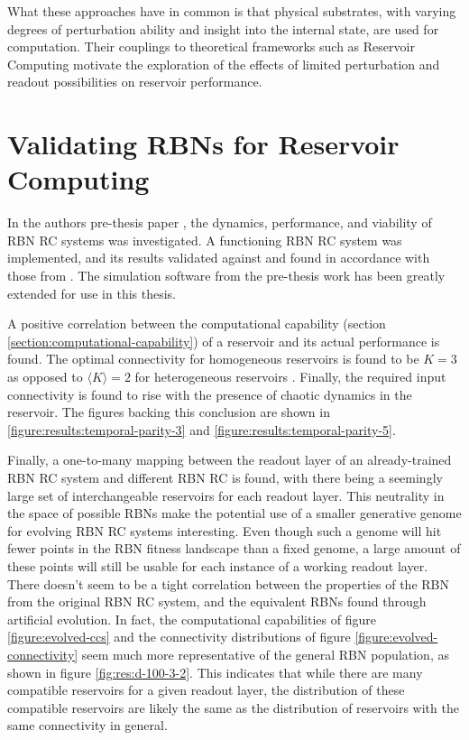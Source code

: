 What these approaches have in common is that physical substrates,
with varying degrees of perturbation ability and insight into the internal state,
are used for computation.
Their couplings to theoretical frameworks such as Reservoir Computing motivate the exploration of the effects of limited perturbation and readout possibilities on reservoir performance.

\section{Validating RBNs for Reservoir Computing}
\label{section:pre-thesis-project}

In the authors pre-thesis paper \cite{burkow2015evolving}, the dynamics, performance, and viability of RBN RC systems was investigated.
A functioning RBN RC system was implemented,
and its results validated against and found in accordance with those from \cite{rbn-reservoir}.
The simulation software from the pre-thesis work has been greatly extended for use in this thesis.

A positive correlation between the computational capability (section \ref{section:computational-capability}) of a reservoir and its actual performance is found.
The optimal connectivity for homogeneous reservoirs is found to be $K=3$ as opposed to $\langle K \rangle = 2$ for heterogeneous reservoirs \cite{rbn-reservoir}.
Finally, the required input connectivity is found to rise with the presence of chaotic dynamics in the reservoir.
The figures backing this conclusion are shown in \ref{figure:results:temporal-parity-3} and \ref{figure:results:temporal-parity-5}.

Finally, a one-to-many mapping between the readout layer of an already-trained RBN RC system and different RBN RC is found,
with there being a seemingly large set of interchangeable reservoirs for each readout layer.
This neutrality in the space of possible RBNs make the potential use of a smaller generative genome for evolving RBN RC systems interesting.
Even though such a genome will hit fewer points in the RBN fitness landscape than a fixed genome,
a large amount of these points will still be usable for each instance of a working readout layer.
There doesn't seem to be a tight correlation between the properties of the RBN from the original RBN RC system,
and the equivalent RBNs found through artificial evolution.
In fact, the computational capabilities of figure \ref{figure:evolved-ccs} and the connectivity distributions of figure \ref{figure:evolved-connectivity} seem much more representative of the general RBN population, as shown in figure \ref{fig:res:d-100-3-2}.
This indicates that while there are many compatible reservoirs for a given readout layer,
the distribution of these compatible reservoirs are likely the same as the distribution of reservoirs with the same connectivity in general.

